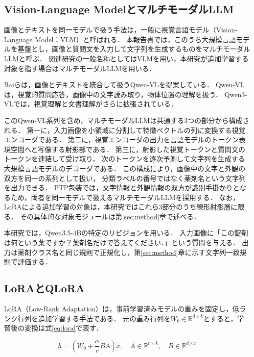 \documentclass[uplatex,dvipdfmx]{jsarticle}
\begin{document}
\subsection{Vision-Language Modelとマルチモーダル\mbox{LLM}}\label{sec:vlm}

画像とテキストを同一モデルで扱う手法は，一般に視覚言語モデル（Vision-Language Model：VLM）と呼ばれる．
本報告書では，このうち大規模言語モデルを基盤とし，画像と質問文を入力して文字列を生成するものをマルチモーダルLLMと呼ぶ．
関連研究の一般名称としてはVLMを用い，本研究が追加学習する対象を指す場合はマルチモーダルLLMを用いる．

Baiらは，画像とテキストを統合して扱うQwen-VLを提案している\cite{bai2023qwenvl}．
Qwen-VLは，視覚的質問応答，画像中の文字読み取り，物体位置の理解を扱う．
Qwen3-VLでは，視覚理解と文書理解がさらに拡張されている\cite{qwen3vl2025}．

このQwen-VL系列を含め，マルチモーダルLLMは共通する3つの部分から構成される\cite{bai2023qwenvl,qwen3vl2025}．
第一に，入力画像を小領域に分割して特徴ベクトルの列に変換する視覚エンコーダである．
第二に，視覚エンコーダの出力を言語モデルのトークン表現空間へと写像する射影部である．
第三に，射影した視覚トークンと質問文のトークンを連結して受け取り，
次のトークンを逐次予測して文字列を生成する大規模言語モデルのデコーダである．
この構成により，画像中の文字と外観の双方を同一の系列として扱い，
分類ラベルの番号ではなく薬剤名という文字列を出力できる．
PTP包装では，文字情報と外観情報の双方が識別手掛かりとなるため，両者を同一モデルで扱えるマルチモーダルLLMを採用する．
なお，LoRAによる追加学習の対象は，本研究ではこれら3部分のうち線形射影層に限る．
その具体的な対象モジュールは第\ref{sec:method}章で述べる．

本研究では，Qwen3.5-4Bの特定のリビジョンを用いる\cite{qwen35model}．
入力画像に「この錠剤は何という薬ですか？薬剤名だけで答えてください．」という質問を与える．
出力は薬剤クラス名と同じ規則で正規化し，第\ref{sec:method}章に示す文字列一致規則で評価する．

\subsection{LoRAとQLoRA}

LoRA（Low-Rank Adaptation）は，事前学習済みモデルの重みを固定し，低ランク行列を追加学習する手法である\cite{hu2022lora}．
元の重み行列を$W_0 \in \mathbb{R}^{d \times k}$とすると，学習後の変換は式\eqref{eq:lora}で表す．

\begin{equation}
  h = \left(W_0 + \frac{\alpha}{r}BA\right)x,
  \quad
  A \in \mathbb{R}^{r \times k},
  \quad
  B \in \mathbb{R}^{d \times r}
  \label{eq:lora}
\end{equation}
\end{document}

